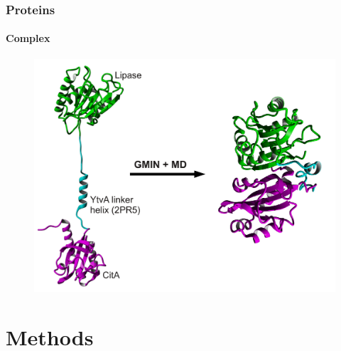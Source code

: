 \documentclass[english]{beamer}
\begin{document}

\begin{frame}
    \frametitle{Proteins}
    \framesubtitle{Complex}

    \begin{figure}
        \includegraphics[width=.9\linewidth]{figures/complex/complex_folding.pdf}
    \end{figure}       

\end{frame}   


\section{Methods}
\end{document}

